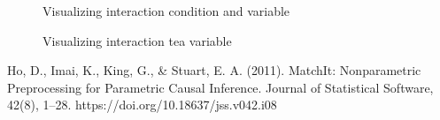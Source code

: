 \documentclass{article}
\begin{document}
\begin{figure}[H]
  \caption{Visualizing interaction condition and variable}
  \noindent{}
  \centering
\end{figure}

\begin{figure}[H]
  \caption{Visualizing interaction tea variable}
  \noindent{}
  \centering
\end{figure}

Ho, D., Imai, K., King, G., \& Stuart, E. A. (2011). MatchIt: Nonparametric Preprocessing for Parametric Causal Inference. Journal of Statistical Software, 42(8), 1–28. https://doi.org/10.18637/jss.v042.i08
\end{document}
